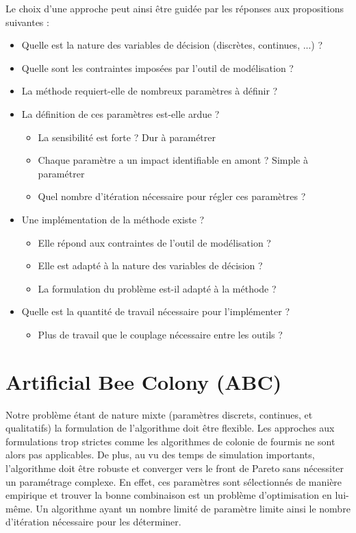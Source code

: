 {
\noindent
Le choix d’une approche peut ainsi être guidée par les réponses aux propositions suivantes :
\begin{itemize}
  \item Quelle est la nature des variables de décision (discrètes, continues, ...) ?
  \item Quelle sont les contraintes imposées par l’outil de modélisation ?
  \item La méthode requiert-elle de nombreux paramètres à définir ?
  \item La définition de ces paramètres est-elle ardue ?
    \begin{itemize}
      \item La sensibilité est forte ? Dur à paramétrer
      \item Chaque paramètre a un impact identifiable en amont ? Simple à paramétrer
      \item Quel nombre d’itération nécessaire pour régler ces paramètres ?
    \end{itemize}
  \item Une implémentation de la méthode existe ?
    \begin{itemize}
      \item Elle répond aux contraintes de l’outil de modélisation ?
      \item Elle est adapté à la nature des variables de décision ?
      \item La formulation du problème est-il adapté à la méthode ?
    \end{itemize}
  \item Quelle est la quantité de travail nécessaire pour l’implémenter ?
    \begin{itemize}
      \item Plus de travail que le couplage nécessaire entre les outils ?
    \end{itemize}
\end{itemize}
}




\section{Artificial Bee Colony (ABC)} %
\label{sec:artificial_bee_colony}
Notre problème étant de nature mixte (paramètres discrets, continues, et qualitatifs)
la formulation de l’algorithme doit être flexible. Les approches aux formulations
trop strictes comme les algorithmes de colonie de fourmis ne sont alors pas applicables.
De plus, au vu des temps de simulation importants, l’algorithme doit être robuste
et converger vers le front de Pareto sans nécessiter un paramétrage complexe.
En effet, ces paramètres sont sélectionnés de manière empirique et trouver la
bonne combinaison est un problème d’optimisation en lui-même. Un algorithme ayant
un nombre limité de paramètre limite ainsi le nombre d’itération nécessaire pour
les déterminer.

